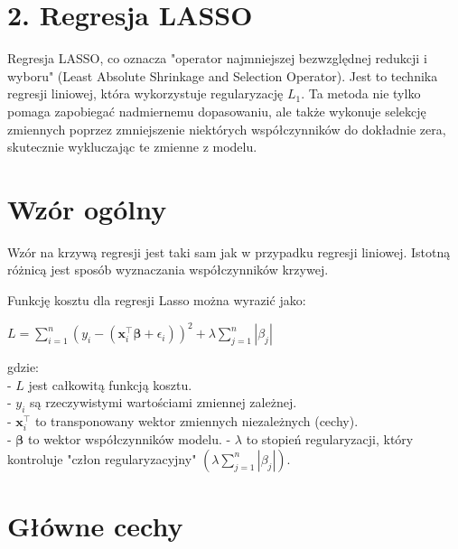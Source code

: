 {}
\justify
\fontsize{14}{16}\selectfont
\setlength{\parindent}{0pt}
\section*{2. Regresja LASSO \cite{alma991000280759708832}}
\fontsize{12}{14}\selectfont
\vspace{-1.0em}

\hspace{1.5cm} Regresja LASSO, co oznacza "operator najmniejszej bezwzględnej redukcji i wyboru" (Least Absolute Shrinkage and Selection Operator). Jest to technika regresji liniowej, która wykorzystuje regularyzację $L_1$. Ta metoda nie tylko pomaga zapobiegać nadmiernemu dopasowaniu, ale także wykonuje selekcję zmiennych poprzez zmniejszenie niektórych współczynników do dokładnie zera, skutecznie wykluczając te zmienne z modelu.

{}
\section*{Wzór ogólny \cite{url_stochasticbard_lasso_regression}}
\vspace{-1.0em}


\hspace{1.5cm} Wzór na krzywą regresji jest taki sam jak w przypadku regresji liniowej. Istotną różnicą jest sposób wyznaczania współczynników krzywej.

Funkcję kosztu dla regresji Lasso można wyrazić jako:
\begin{center}

$L = \sum_{i=1}^{n} (y_i - (\boldsymbol{x}_i^{\top} \boldsymbol{\beta} + \epsilon_i))^2 + \lambda \sum_{j=1}^{n} |\beta_j|$
\end{center}

gdzie: \\
- $L$ jest całkowitą funkcją kosztu.\\
- $y_i$ są rzeczywistymi wartościami zmiennej zależnej.\\
- $\boldsymbol{x}_i^{\top}$ to transponowany wektor zmiennych niezależnych (cechy).\\
- $\boldsymbol{\beta}$ to wektor współczynników modelu.
- $\lambda$ to stopień regularyzacji, który kontroluje "człon regularyzacyjny" $( \lambda \sum_{j=1}^{n} |\beta_j|)$.

{}
\section*{Główne cechy}
\vspace{-1.0em}


